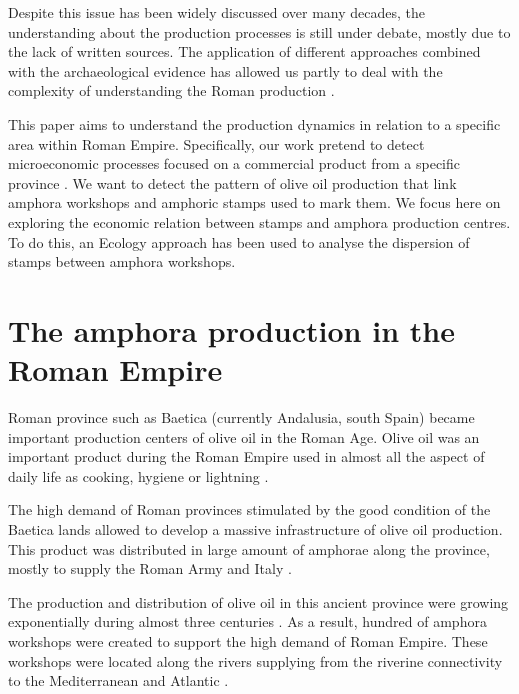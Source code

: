 \documentclass[review]{elsarticle}
\begin{document}
Despite this issue has been widely discussed over many decades, the understanding about the production processes is still under debate, mostly due to the lack of written sources. The application of different approaches combined with the archaeological evidence has allowed us partly to deal with the complexity of understanding the Roman production \citep{orengo_seeds_2016,brughmans_roman_2016,coto-sarmiento_maria_bayesian_????}.

This paper aims to understand the production dynamics in relation to a specific area within Roman Empire. Specifically, our work pretend to detect microeconomic processes focused on a commercial product from a specific province \citep{isaksen_network_2006}. We want to detect the pattern of olive oil production that link amphora workshops and amphoric stamps used to mark them. We focus here on exploring the economic relation between stamps and amphora production centres. To do this, an Ecology approach has been used to analyse the dispersion of stamps between amphora workshops. 



 


\section{The amphora production in the Roman Empire}

Roman province such as Baetica (currently Andalusia, south Spain) became important production centers of olive oil in the Roman Age. Olive oil was an important product during the Roman Empire used in almost all the aspect of daily life as cooking, hygiene or lightning \citep{mattingly_d.j._oil_1988}. 

The high demand of Roman provinces stimulated by the good condition of the Baetica lands allowed to develop a massive infrastructure of olive oil production. This product was distributed in large amount of amphorae along the province, mostly to supply the Roman Army and Italy \citep{blazquez_exportacion_1980}. 

The production and distribution of olive oil in this ancient province were growing exponentially during almost three centuries \citep{remesal_concierto}. As a result, hundred of amphora workshops were created to support the high demand of Roman Empire. These workshops were located along the rivers supplying from the riverine connectivity to the Mediterranean and Atlantic \citep{garcia_vargas_enrique_formal_2010}. 
\end{document}
